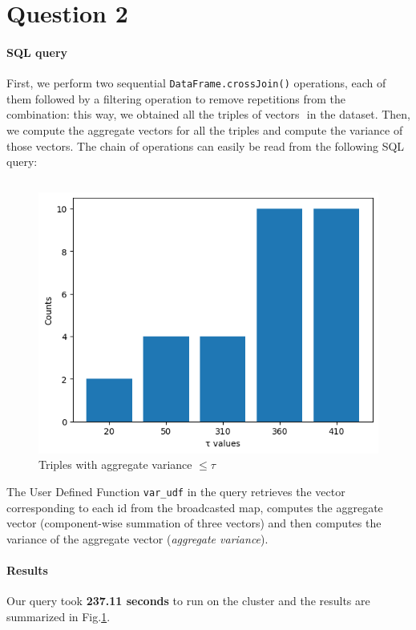 \section{Question 2}
\label{sec:q2}
\paragraph{\textbf{SQL query}}
First, we perform two sequential \texttt{DataFrame.crossJoin()} operations, each of them followed by a filtering operation to remove repetitions from the combination: this way, we obtained all the triples of vectors \(<X,Y,Z>\) in the dataset. Then, we compute the aggregate vectors for all the triples and compute the variance of those vectors. The chain of operations can easily be read from the following SQL query:
\begin{figure}[H]
\begin{minipage}{.6\textwidth}
\inputminted[fontsize=\footnotesize,]{sql}{../assets/code/q2.sql}
\end{minipage}
\begin{minipage}{.4\textwidth}
    \centering
    \includegraphics[width=.75\linewidth]{../assets/images/q2_results.png}
    \caption{Triples with aggregate variance $ \le \tau$}
    \label{fig:q2_results}
\end{minipage}
\end{figure}
The User Defined Function \texttt{var_udf} in the query retrieves the vector corresponding to each id from the broadcasted map, computes the aggregate vector (component-wise summation of three vectors) and then computes the variance of the aggregate vector (\emph{aggregate variance}).

\paragraph{\textbf{Results}}
Our query took \textbf{237.11 seconds} to run on the cluster and the results are summarized in Fig.\ref{fig:q2_results}.

